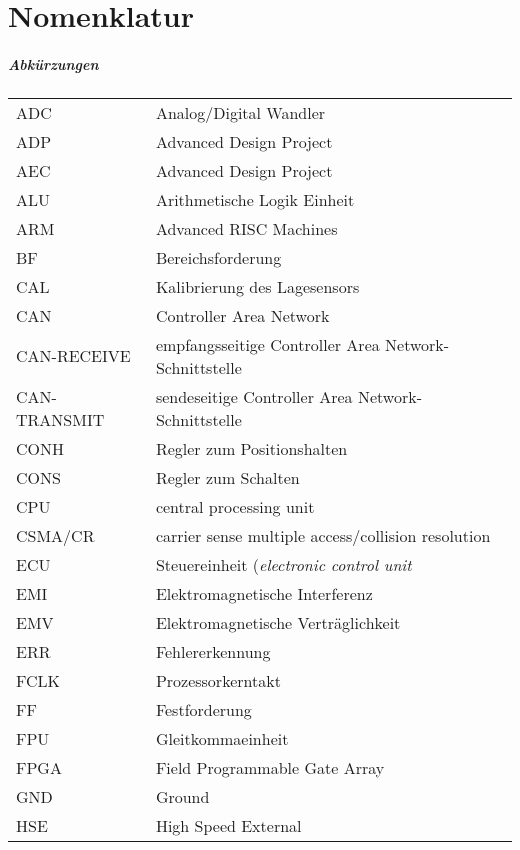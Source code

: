 \chapter*{Nomenklatur}
\paragraph{Abk\"urzungen}
\begin{table}[H]
	\centering
		\begin{tabular}{p{2cm}p{15cm}}
			ADC \dotfill & Analog/Digital Wandler\\
			ADP \dotfill & Advanced Design Project\\
			AEC \dotfill & Advanced Design Project\\
			ALU \dotfill & Arithmetische Logik Einheit\\
			ARM\dotfill & Advanced RISC Machines\\
			BF\dotfill & Bereichsforderung\\
			CAL\dotfill & Kalibrierung des Lagesensors\\
			CAN\dotfill & Controller Area Network\\
			CAN-RECEIVE\dotfill & empfangsseitige Controller Area Network-Schnittstelle\\
			CAN-TRANSMIT\dotfill & sendeseitige Controller Area Network-Schnittstelle\\
			CONH\dotfill & Regler zum Positionshalten\\
			CONS\dotfill & Regler zum Schalten\\
			CPU\dotfill & central processing unit\\
			CSMA/CR\dotfill & carrier sense multiple access/collision resolution\\
			ECU\dotfill & Steuereinheit (\textit{electronic control unit}\\
			EMI\dotfill & Elektromagnetische Interferenz\\
			EMV\dotfill & Elektromagnetische Verträglichkeit\\
			ERR\dotfill & Fehlererkennung\\
			FCLK\dotfill & Prozessorkerntakt\\
			FF\dotfill & Festforderung\\
			FPU\dotfill & Gleitkommaeinheit\\
			FPGA\dotfill & Field Programmable Gate Array\\
			GND\dotfill & Ground\\
			HSE\dotfill & High Speed External\\

\end{tabular}
\end{table}
